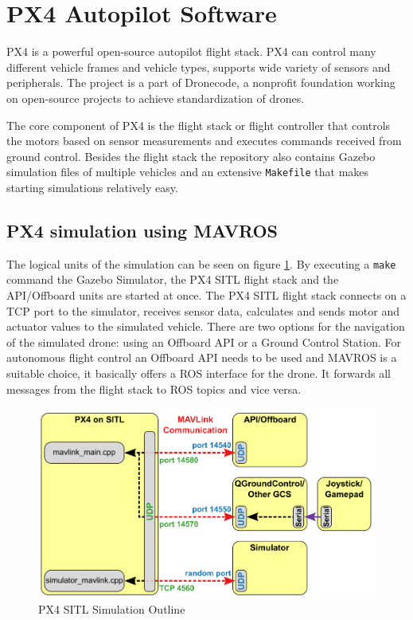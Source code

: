 \section{PX4 Autopilot Software}
PX4 is a powerful open-source autopilot flight stack. PX4 can control many different vehicle frames and vehicle 
types, supports wide variety of sensors and peripherals. The project is a part of Dronecode, a nonprofit
foundation working on open-source projects to achieve standardization of drones.\cite{PX4Website} 

The core component of PX4 is the flight stack or flight controller that controls the motors based on sensor
measurements and executes commands received from ground control. Besides the flight stack the repository 
also contains Gazebo simulation files of multiple vehicles and an extensive \verb|Makefile| that makes 
starting simulations relatively easy. 

\subsection{PX4 simulation using MAVROS}
The logical units of the simulation can be seen on figure \ref{fig:px4_sitl_simulation}.
By executing a \verb|make| command the Gazebo Simulator, the PX4 SITL flight stack and the API/Offboard units
are started at once. The PX4 SITL flight stack connects on a TCP port to the simulator, receives sensor data, 
calculates and sends motor and actuator values to the simulated vehicle. There are two options for the navigation
of the simulated drone: using an Offboard API or a Ground Control Station. For autonomous flight control an 
Offboard API needs to be used and MAVROS is a suitable choice, it basically offers a ROS interface for 
the drone. It forwards all messages from the flight stack to ROS topics and vice versa.

\begin{figure}[h]
    \centering
    \includegraphics[width=120mm, keepaspectratio]{figures/px4_sitl_overview.png}
    \caption{PX4 SITL Simulation Outline \cite{PX4Simulation}}
    \label{fig:px4_sitl_simulation}
\end{figure}

